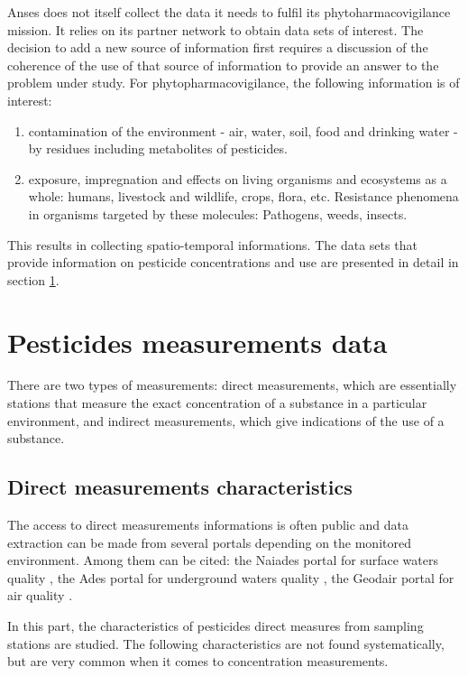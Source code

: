 Anses does not itself collect the data it needs to fulfil its phytoharmacovigilance mission. It relies on its partner network to obtain data sets of interest. The decision to add a new source of information first requires a discussion of the coherence of the use of that source of information to provide an answer to the problem under study. For phytopharmacovigilance, the following information is of interest: 
\begin{enumerate}
\item contamination of the environment - air, water, soil, food and drinking water - by residues including metabolites of pesticides.
\item exposure, impregnation and effects on living organisms and ecosystems as a whole: humans, livestock and wildlife, crops, flora, etc. Resistance phenomena in organisms targeted by these molecules: Pathogens, weeds, insects.
\end{enumerate}
This results in collecting spatio-temporal informations. The data sets that provide information on pesticide concentrations and use are presented in detail in section \ref{chp:2:3}.

\section{Pesticides measurements data}\label{chp:2:3}

There are two types of measurements: direct measurements, which are essentially stations that measure the exact concentration of a substance in a particular environment, and indirect measurements, which give indications of the use of a substance.

\subsection{Direct measurements characteristics}

The access to direct measurements informations is often public and data extraction can be made from several portals depending on the monitored environment. Among them can be cited: the Naiades portal for surface waters quality \citep{Naiade2}, the Ades portal for underground waters quality \citep{Ades}, the Geodair portal for air quality \citep{Geodair}.
 
In this part, the characteristics of pesticides direct measures from sampling stations are studied. The following characteristics are not found systematically, but are very common when it comes to concentration measurements.  

